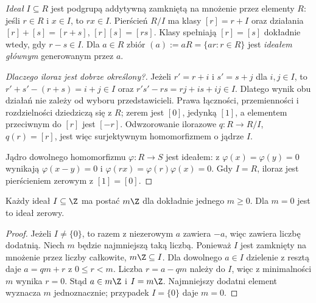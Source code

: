 \begin{definicja}
\label{def:ideal-iloraz}
\emph{Ideał} $I\subseteq R$ jest podgrupą
addytywną zamkniętą na mnożenie przez
elementy $R$: jeśli $r\in R$ i $x\in I$,
to $rx\in I$. Pierścień $R/I$ ma klasy
$[r]=r+I$ oraz działania
$[r]+[s]=[r+s]$, $[r][s]=[rs]$.
Klasy spełniają $[r]=[s]$ dokładnie wtedy, gdy
$r-s\in I$. Dla $a\in R$ zbiór
$(a):=aR=\{ar:r\in R\}$ jest \emph{ideałem głównym}
generowanym przez $a$.
\end{definicja}

\begin{proof}[Dlaczego iloraz jest dobrze określony?]
Jeżeli $r'=r+i$ i $s'=s+j$ dla $i,j\in I$,
to $r'+s'-(r+s)=i+j\in I$ oraz
$r's'-rs=rj+is+ij\in I$.
Dlatego wynik obu działań nie zależy od
wyboru przedstawicieli. Prawa łączności, przemienności
i rozdzielności dziedziczą się z $R$;
zerem jest $[0]$, jedynką $[1]$, a elementem
przeciwnym do $[r]$ jest $[-r]$.
Odwzorowanie ilorazowe $q:R\to R/I$, $q(r)=[r]$,
jest więc surjektywnym homomorfizmem o jądrze $I$.

Jądro dowolnego homomorfizmu $\varphi:R\to S$ jest ideałem:
z $\varphi(x)=\varphi(y)=0$ wynikają
$\varphi(x-y)=0$ i
$\varphi(rx)=\varphi(r)\varphi(x)=0$.
Gdy $I=R$, iloraz jest pierścieniem zerowym
z $[1]=[0]$.
\end{proof}

\begin{stwierdzenie}
\label{prop:idealy-Z-5}
Każdy ideał $I\subseteq\Z$ ma postać $m\Z$ dla dokładnie
jednego $m\geq0$. Dla $m=0$ jest to ideał zerowy.
\end{stwierdzenie}
\begin{proof}
Jeżeli $I\ne\{0\}$, to razem z niezerowym $a$ zawiera $-a$,
więc zawiera liczbę dodatnią. Niech $m$ będzie najmniejszą taką
liczbą. Ponieważ $I$ jest zamknięty na mnożenie przez liczby
całkowite, $m\Z\subseteq I$. Dla dowolnego $a\in I$
dzielenie z resztą daje $a=qm+r$ z $0\leq r<m$.
Liczba $r=a-qm$ należy do $I$, więc z minimalności $m$
wynika $r=0$. Stąd $a\in m\Z$ i $I=m\Z$.
Najmniejszy dodatni element wyznacza $m$ jednoznacznie;
przypadek $I=\{0\}$ daje $m=0$.
\end{proof}

